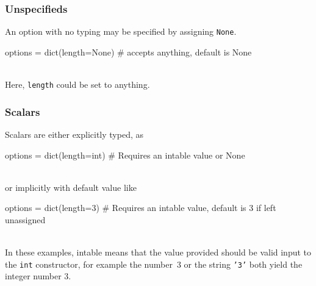 \subsubsection{Unspecifieds}
An option with no typing may be specified by assigning \texttt{None}.
\\
\begin{python}
  options = dict(length=None)
  # accepts anything, default is None
\end{python}
\\
Here, \texttt{length} could be set to anything.



\subsubsection*{Scalars}
Scalars are either explicitly typed, as
\\
\begin{python}
  options = dict(length=int)
  # Requires an intable value or None
\end{python}
\\
or implicitly with default value like

\begin{python}
  options = dict(length=3)
  # Requires an intable value, default is 3 if left unassigned
\end{python}
\\
In these examples, intable means that the value provided should be
valid input to the \texttt{int} constructor, for example the number~3
or the string \texttt{'3'} both yield the integer number 3.



